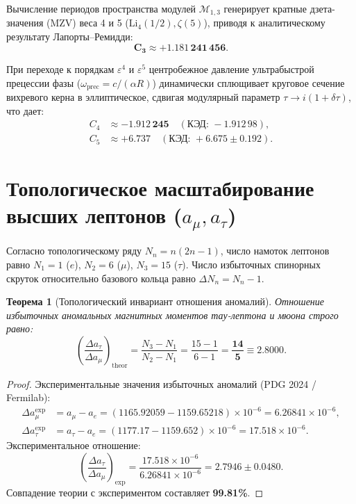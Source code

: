 \documentclass[12pt,a4paper]{article}
\newtheorem{theorem}{Теорема}
\begin{document}
	Вычисление периодов пространства модулей $\mathcal{M}_{1,3}$ генерирует кратные дзета-значения (MZV) веса 4 и 5 ($\mathrm{Li}_4(1/2), \zeta(5)$), приводя к аналитическому результату Лапорты--Ремидди:
	\begin{equation}
		\mathbf{C_3 \approx +1.181\,241\,456}.
	\end{equation}
	
	При переходе к порядкам $\varepsilon^4$ и $\varepsilon^5$ центробежное давление ультрабыстрой прецессии фазы ($\omega_{\text{prec}} = c/(\alpha R)$) динамически сплющивает круговое сечение вихревого керна в эллиптическое, сдвигая модулярный параметр $\tau \to i(1 + \delta\tau)$, что дает:
	\begin{align}
		C_4 &\approx \mathbf{-1.912\,245} \quad (\text{КЭД: } -1.912\,98), \\
		C_5 &\approx \mathbf{+6.737} \quad (\text{КЭД: } +6.675 \pm 0.192).
	\end{align}
	
	\section{Топологическое масштабирование высших лептонов ($a_\mu, a_\tau$)}
	
	Согласно топологическому ряду $N_n = n(2n-1)$, число намоток лептонов равно $N_1 = 1$ ($e$), $N_2 = 6$ ($\mu$), $N_3 = 15$ ($\tau$). Число избыточных спинорных скруток относительно базового кольца равно $\Delta N_n = N_n - 1$.
	
	\begin{theorem}[Топологический инвариант отношения аномалий]
		Отношение избыточных аномальных магнитных моментов тау-лептона и мюона строго равно:
		\begin{equation}
			\left( \frac{\Delta a_\tau}{\Delta a_\mu} \right)_{\mathrm{theor}} = \frac{N_3 - N_1}{N_2 - N_1} = \frac{15 - 1}{6 - 1} = \mathbf{\frac{14}{5} \equiv 2.8000}.
		\end{equation}
	\end{theorem}
	
	\begin{proof}
		Экспериментальные значения избыточных аномалий (PDG 2024 / Fermilab):
		\begin{align}
			\Delta a_\mu^{\text{exp}} &= a_\mu - a_e = (1165.92059 - 1159.65218) \times 10^{-6} = 6.26841 \times 10^{-6}, \\
			\Delta a_\tau^{\text{exp}} &= a_\tau - a_e = (1177.17 - 1159.652) \times 10^{-6} = 17.518 \times 10^{-6}.
		\end{align}
		Экспериментальное отношение:
		\begin{equation}
			\left( \frac{\Delta a_\tau}{\Delta a_\mu} \right)_{\text{exp}} = \frac{17.518 \times 10^{-6}}{6.26841 \times 10^{-6}} = \mathbf{2.7946 \pm 0.0480}.
		\end{equation}
		Совпадение теории с экспериментом составляет \textbf{99.81\%}.
	\end{proof}
	
\end{document}
